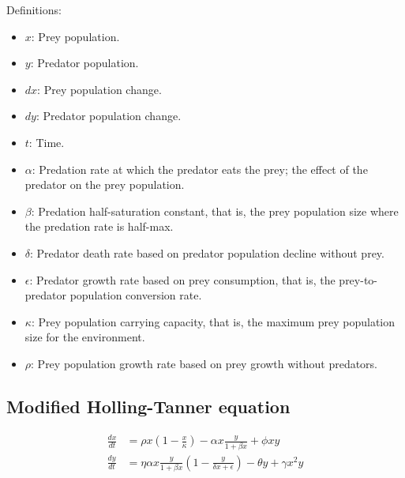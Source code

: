 Definitions:
\begin{itemize}
\item $x$: Prey population.
\item $y$: Predator population.
\item $dx$: Prey population change.
\item $dy$: Predator population change.
\item $t$: Time.
\item $\alpha$: Predation rate at which the predator eats the prey; the effect of the predator on the prey population.
\item $\beta$: Predation half-saturation constant, that is, the prey population size where the predation rate is half-max.
\item $\delta$: Predator death rate based on predator population decline without prey.
\item $\epsilon$: Predator growth rate based on prey consumption, that is, the prey-to-predator population conversion rate.
\item $\kappa$: Prey population carrying capacity, that is, the maximum prey population size for the environment.
\item $\rho$: Prey population growth rate based on prey growth without predators.
\end{itemize}

\subsection{Modified Holling-Tanner equation}
\begin{align*}
\frac{dx}{dt} &= \rho x \left(1 - \frac{x}{\kappa}\right) - \alpha x \frac{y}{1 + \beta x} + \phi x y \\
\frac{dy}{dt} &= \eta \alpha x \frac{y}{1 + \beta x} \left(1 - \frac{y}{\delta x + \epsilon}\right) - \theta y + \gamma x^2 y
\end{align*}

